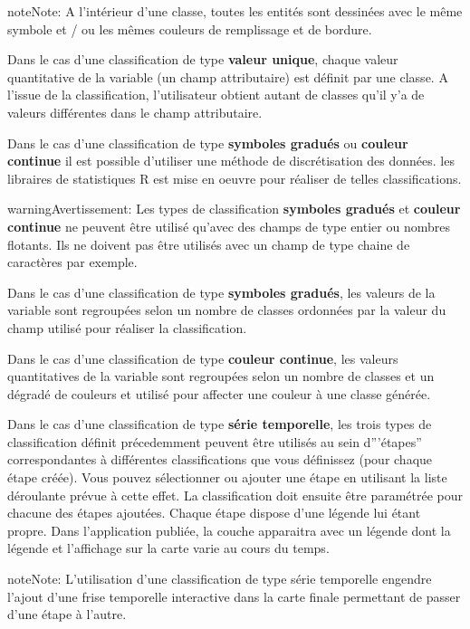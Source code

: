\documentclass[letterpaper,10pt,french]{sphinxmanual}
\begin{document}
\begin{notice}{note}{Note:}
A l'intérieur d'une classe,
toutes les entités sont dessinées avec le même symbole et / ou les
mêmes couleurs de remplissage et de bordure.
\end{notice}

Dans le cas d'une classification de type \textbf{valeur unique}, chaque
valeur quantitative de la variable (un champ attributaire) est définit
par une classe. A l'issue de la classification, l'utilisateur obtient
autant de classes qu'il y'a de valeurs différentes dans le champ
attributaire.

Dans le cas d'une classification de type \textbf{symboles gradués} ou
\textbf{couleur continue} il est possible d'utiliser une méthode de
discrétisation des données. les libraires de statistiques R est mise
en oeuvre pour réaliser de telles classifications.

\begin{notice}{warning}{Avertissement:}
Les types de classification \textbf{symboles gradués} et \textbf{couleur
continue} ne peuvent être utilisé qu'avec des champs de type
entier ou nombres flotants. Ils ne doivent pas être utilisés avec
un champ de type chaine de caractères par exemple.
\end{notice}

Dans le cas d'une classification de type \textbf{symboles gradués}, les
valeurs de la variable sont regroupées selon un nombre de classes
ordonnées par la valeur du champ utilisé pour réaliser la classification.

Dans le cas d'une classification de type \textbf{couleur continue}, les
valeurs quantitatives de la variable sont regroupées selon un nombre
de classes et un dégradé de couleurs et utilisé pour affecter une
couleur à une classe générée.

Dans le cas d'une classification de type \textbf{série temporelle}, les
trois types de classification définit précedemment peuvent être
utilisés au sein d'''étapes'' correspondantes à différentes
classifications que vous définissez (pour chaque étape créée). Vous
pouvez sélectionner ou ajouter une étape en utilisant la liste déroulante
prévue à cette effet. La classification doit ensuite être paramétrée
pour chacune des étapes ajoutées. Chaque étape dispose d'une légende
lui étant propre. Dans l'application publiée, la couche apparaitra
avec un légende dont la légende et l'affichage sur la carte varie au
cours du temps.

\begin{notice}{note}{Note:}
L'utilisation d'une classification de type série temporelle engendre l'ajout d'une frise temporelle interactive dans la carte finale permettant de passer d'une étape à l'autre.
\end{notice}
\end{document}
